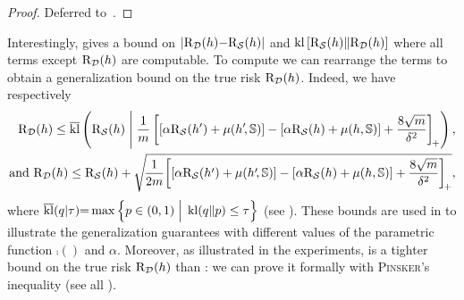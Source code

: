 \begin{noaddcontents}\begin{proof}
Deferred to~.
\end{proof}\end{noaddcontents}

Interestingly,  gives a bound on $\vert\text{R}_{\mathcal{D}}(h){-}\text{R}_{\mathcal{S}}(h)\vert$ and $\operatorname{kl}\left[\text{R}_{\mathcal{S}}(h)\|\text{R}_{\mathcal{D}}(h)\right]$ where all terms except $\text{R}_{\mathcal{D}}(h)$ are computable.
To compute  we can rearrange the terms to obtain a generalization bound on the true risk $\text{R}_{\mathcal{D}}(h)$.
Indeed, we have respectively
\begin{align}
\text{R}_{\mathcal{D}}(h) \le \overline{\operatorname{kl}}\left(\text{R}_{\mathcal{S}}(h) \;\middle|\; \frac{1}{m}\left[ \left[\alpha\text{R}_{\mathcal{S}}(h{'}) + \operatorname{\mu}(h'\!,\mathbb{S})\right] - \left[\alpha\text{R}_{\mathcal{S}}(h)+\operatorname{\mu}(h,\mathbb{S})\right] + \frac{8\sqrt{m}}{\delta^2} \right]_{\!+}\right),\label{chap:dis-mu:eq:disintegrated-comp-seeger-risk}\\
\text{and}\ \text{R}_{\mathcal{D}}(h) \le \text{R}_{\mathcal{S}}(h) + \sqrt{\!
    \frac{1}{2m}\!\left[ \left[\alpha\text{R}_{\mathcal{S}}(h{'}) + \operatorname{\mu}(h'\!,\mathbb{S})\right] - \left[\alpha\text{R}_{\mathcal{S}}(h)+\operatorname{\mu}(h,\mathbb{S})\right] + \frac{8\sqrt{m}}{\delta^2} \right]_{\!+}},\label{chap:dis-mu:eq:disintegrated-comp-mcallester-risk}
\end{align}
where $\overline{\operatorname{kl}}(q | \tau){=}\max\Big\{ p \in (0,1) \;\Big|\; \operatorname{kl}(q\|p) \le \tau\Big\}$ (see ). 
These bounds are used in  to illustrate the generalization guarantees with different values of the parametric function $\comp()$ and $\alpha$.
Moreover, as illustrated in the experiments,  is a tighter bound on the true risk $\text{R}_{\mathcal{D}}(h)$ than : we can prove it formally with \textsc{Pinsker}'s inequality (see all ).\\

